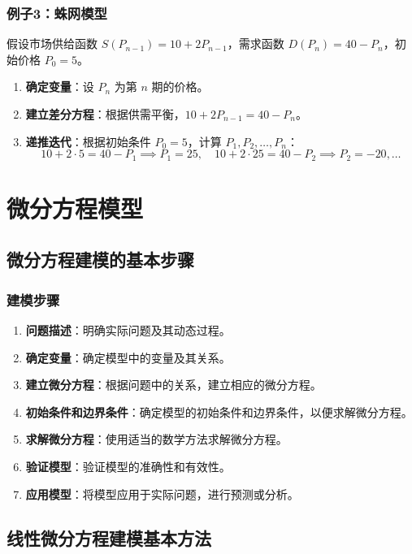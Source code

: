 \documentclass[UTF8]{ctexart}
\begin{document}
\subsubsection {例子3：蛛网模型}
假设市场供给函数 \( S(P_{n-1}) = 10 + 2P_{n-1} \)，需求函数 \( D(P_n) = 40 - P_n \)，初始价格 \( P_0 = 5 \)。
\begin{enumerate}
    \item \textbf{确定变量}：设 \( P_n \) 为第 \( n \) 期的价格。
    \item \textbf{建立差分方程}：根据供需平衡，\( 10 + 2P_{n-1} = 40 - P_n \)。
    \item \textbf{递推迭代}：根据初始条件 \( P_0 = 5 \)，计算 \( P_1, P_2, \ldots, P_n \)：
    \[
    10 + 2 \cdot 5 = 40 - P_1 \implies P_1 = 25, \quad 10 + 2 \cdot 25 = 40 - P_2 \implies P_2 = -20, \ldots
    \]
\end{enumerate}

\newpage

\section {微分方程模型}
\subsection {微分方程建模的基本步骤}
\subsubsection {建模步骤}
\begin{enumerate}
    \item \textbf{问题描述}：明确实际问题及其动态过程。
    \item \textbf{确定变量}：确定模型中的变量及其关系。
    \item \textbf{建立微分方程}：根据问题中的关系，建立相应的微分方程。
    \item \textbf{初始条件和边界条件}：确定模型的初始条件和边界条件，以便求解微分方程。
    \item \textbf{求解微分方程}：使用适当的数学方法求解微分方程。
    \item \textbf{验证模型}：验证模型的准确性和有效性。
    \item \textbf{应用模型}：将模型应用于实际问题，进行预测或分析。
\end{enumerate}

\subsection {线性微分方程建模基本方法}
\end{document}
